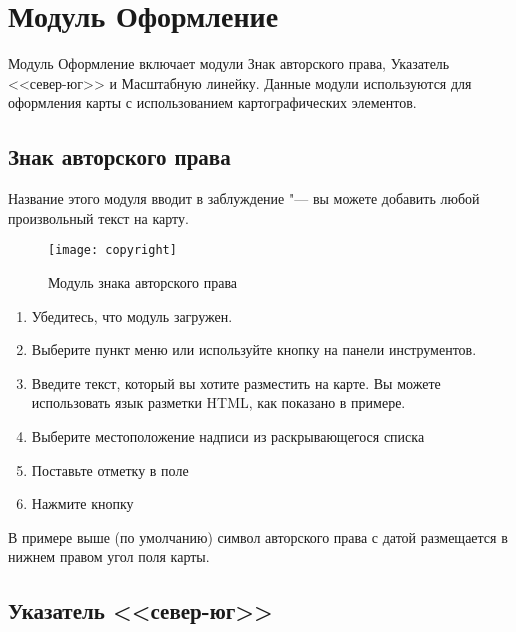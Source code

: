 
\section{Модуль Оформление}


Модуль Оформление включает модули Знак авторского права, Указатель
<<север-юг>> и Масштабную линейку. Данные модули используются для
оформления карты с использованием картографических элементов.

\subsection{Знак авторского права}

Название этого модуля вводит в заблуждение "--- вы можете добавить любой
произвольный текст на карту.

\begin{figure}[ht]
   \centering
   \texttt{[image: copyright]}
   \caption{Модуль знака авторского права \wincaption}\label{fig:copyright}
\end{figure}

\begin{enumerate}
\item Убедитесь, что модуль загружен.
\item Выберите пункт меню  \arrow {}
\arrow {} или
используйте кнопку 
на панели инструментов.
\item Введите текст, который вы хотите разместить на карте. Вы можете
использовать язык разметки HTML, как показано в примере.
\item Выберите местоположение надписи из раскрывающегося списка
\item Поставьте отметку в поле 
\item Нажмите кнопку 
\end{enumerate}

В примере выше (по умолчанию) символ авторского права с датой размещается
в нижнем правом угол поля карты.

\subsection{Указатель <<север-юг>>}

